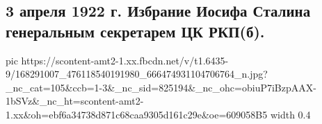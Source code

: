  
 
 
 
 

\subsection{3 апреля 1922 г. Избрание Иосифа Сталина генеральным секретарем ЦК РКП(б).}
\label{sec:03_04_2021.fb.rostovcev_oleg.1.stalin_izbranie_partia_gensek}


\ifcmt
  pic https://scontent-amt2-1.xx.fbcdn.net/v/t1.6435-9/168291007_476118540191980_666474931104706764_n.jpg?_nc_cat=105&ccb=1-3&_nc_sid=825194&_nc_ohc=obiuP7iBzpAAX-1bSVz&_nc_ht=scontent-amt2-1.xx&oh=ebf6a34738d871c68caa9305d161c29e&oe=609058B5
  width 0.4
\fi

